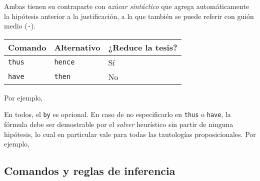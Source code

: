Ambas tienen su contraparte con \textit{azúcar sintáctico} que agrega
automáticamente la hipótesis anterior a la justificación, a la que también se
puede referir con guión medio (\lstinline{-}).

\begin{table}[H]
    \centering
\begin{tabular}{l|l|l}
Comando             & Alternativo             & ¿Reduce la tesis? \\
\hline
\lstinline|thus|    & \lstinline|hence|       & Sí               \\
\lstinline|have|    & \lstinline|then|        & No              
\end{tabular}
\end{table}

Por ejemplo, 
\begin{multicols}{2}
    
    \vfill\null
    \columnbreak
    
\end{multicols}


En todos, el \lstinline{by} es opcional. En caso de no especificarlo en
\lstinline{thus} o \lstinline{have}, la fórmula debe ser demostrable por el
\textit{solver} heurístico sin partir de ninguna hipótesis, lo cual en
particular vale para todas las tautologías proposicionales. Por ejemplo,



\subsection{Comandos y reglas de inferencia}


